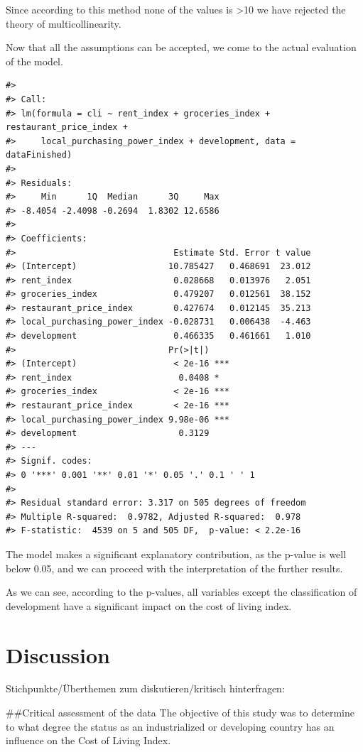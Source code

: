 \documentclass[
  11pt,
  a4paper,
  twoside]{scrbook}
\begin{document}
Since according to this method none of the values is \textgreater10 we have rejected the theory of multicollinearity.

Now that all the assumptions can be accepted, we come to the actual evaluation of the model.

\begin{verbatim}
#> 
#> Call:
#> lm(formula = cli ~ rent_index + groceries_index + restaurant_price_index + 
#>     local_purchasing_power_index + development, data = dataFinished)
#> 
#> Residuals:
#>     Min      1Q  Median      3Q     Max 
#> -8.4054 -2.4098 -0.2694  1.8302 12.6586 
#> 
#> Coefficients:
#>                               Estimate Std. Error t value
#> (Intercept)                  10.785427   0.468691  23.012
#> rent_index                    0.028668   0.013976   2.051
#> groceries_index               0.479207   0.012561  38.152
#> restaurant_price_index        0.427674   0.012145  35.213
#> local_purchasing_power_index -0.028731   0.006438  -4.463
#> development                   0.466335   0.461661   1.010
#>                              Pr(>|t|)    
#> (Intercept)                   < 2e-16 ***
#> rent_index                     0.0408 *  
#> groceries_index               < 2e-16 ***
#> restaurant_price_index        < 2e-16 ***
#> local_purchasing_power_index 9.98e-06 ***
#> development                    0.3129    
#> ---
#> Signif. codes:  
#> 0 '***' 0.001 '**' 0.01 '*' 0.05 '.' 0.1 ' ' 1
#> 
#> Residual standard error: 3.317 on 505 degrees of freedom
#> Multiple R-squared:  0.9782, Adjusted R-squared:  0.978 
#> F-statistic:  4539 on 5 and 505 DF,  p-value: < 2.2e-16
\end{verbatim}

The model makes a significant explanatory contribution, as the p-value is well below 0.05, and we can proceed with the interpretation of the further results.

As we can see, according to the p-values, all variables except the classification of development have a significant impact on the cost of living index.

\hypertarget{discussion}{%
\chapter{Discussion}\label{discussion}}

Stichpunkte/Überthemen zum diskutieren/kritisch hinterfragen:

\#\#Critical assessment of the data
The objective of this study was to determine to what degree the status as an industrialized or developing country has an influence on the Cost of Living Index.
\end{document}
